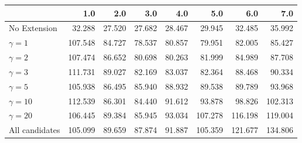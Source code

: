 \begin{tabular}{lrrrrrrr}
\toprule
{} &     1.0 &    2.0 &    3.0 &    4.0 &     5.0 &     6.0 &     7.0 \\
\midrule
No Extension   &  32.288 & 27.520 & 27.682 & 28.467 &  29.945 &  32.485 &  35.992 \\
$\gamma = 1$   & 107.548 & 84.727 & 78.537 & 80.857 &  79.951 &  82.005 &  85.427 \\
$\gamma = 2$   & 107.474 & 86.652 & 80.698 & 80.263 &  81.999 &  84.989 &  87.708 \\
$\gamma = 3$   & 111.731 & 89.027 & 82.169 & 83.037 &  82.364 &  88.468 &  90.334 \\
$\gamma = 5$   & 105.938 & 86.495 & 85.940 & 88.932 &  89.538 &  89.789 &  93.968 \\
$\gamma = 10$  & 112.539 & 86.301 & 84.440 & 91.612 &  93.878 &  98.826 & 102.313 \\
$\gamma = 20$  & 106.445 & 89.384 & 85.945 & 93.034 & 107.278 & 116.198 & 119.004 \\
All candidates & 105.099 & 89.659 & 87.874 & 91.887 & 105.359 & 121.677 & 134.806 \\
\bottomrule
\end{tabular}

